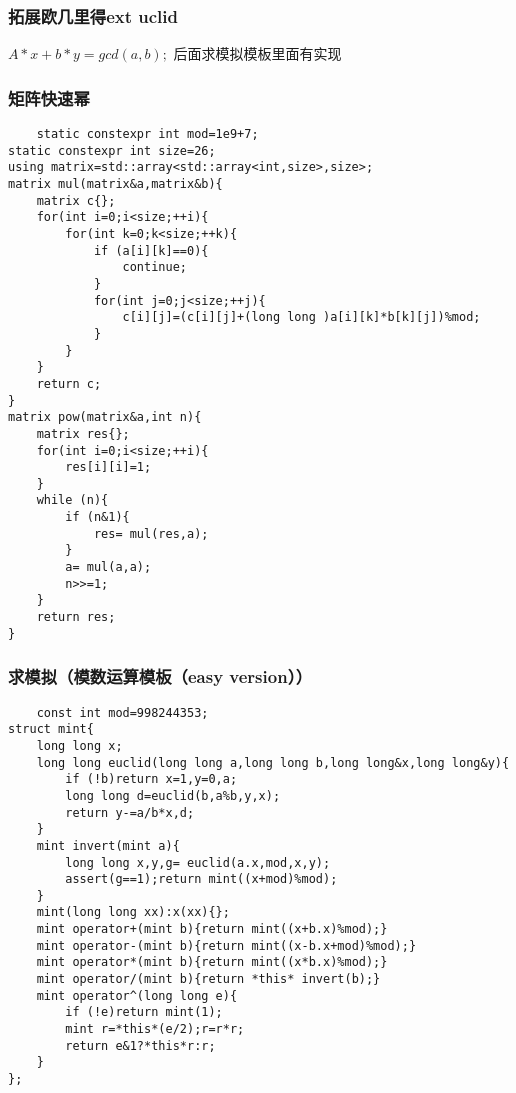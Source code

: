 \documentclass[UTF8]{ctexart}
\begin{document}
\subsubsection{拓展欧几里得ext uclid}
$A*x+b*y=gcd(a,b);$
后面求模拟模板里面有实现
\subsubsection{矩阵快速幂}
\begin{lstlisting}
    static constexpr int mod=1e9+7;
static constexpr int size=26;
using matrix=std::array<std::array<int,size>,size>;
matrix mul(matrix&a,matrix&b){
    matrix c{};
    for(int i=0;i<size;++i){
        for(int k=0;k<size;++k){
            if (a[i][k]==0){
                continue;
            }
            for(int j=0;j<size;++j){
                c[i][j]=(c[i][j]+(long long )a[i][k]*b[k][j])%mod;
            }
        }
    }
    return c;
}
matrix pow(matrix&a,int n){
    matrix res{};
    for(int i=0;i<size;++i){
        res[i][i]=1;
    }
    while (n){
        if (n&1){
            res= mul(res,a);
        }
        a= mul(a,a);
        n>>=1;
    }
    return res;
}
\end{lstlisting}
\subsubsection{求模拟（模数运算模板（easy version））}
\begin{lstlisting}
    const int mod=998244353;
struct mint{
    long long x;
    long long euclid(long long a,long long b,long long&x,long long&y){
        if (!b)return x=1,y=0,a;
        long long d=euclid(b,a%b,y,x);
        return y-=a/b*x,d;
    }
    mint invert(mint a){
        long long x,y,g= euclid(a.x,mod,x,y);
        assert(g==1);return mint((x+mod)%mod);
    }
    mint(long long xx):x(xx){};
    mint operator+(mint b){return mint((x+b.x)%mod);}
    mint operator-(mint b){return mint((x-b.x+mod)%mod);}
    mint operator*(mint b){return mint((x*b.x)%mod);}
    mint operator/(mint b){return *this* invert(b);}
    mint operator^(long long e){
        if (!e)return mint(1);
        mint r=*this*(e/2);r=r*r;
        return e&1?*this*r:r;
    }
};
\end{lstlisting}
\end{document}
